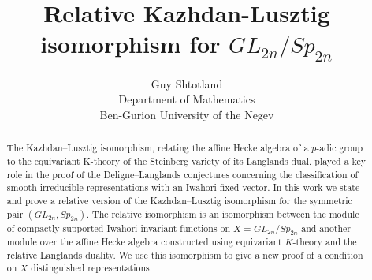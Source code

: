 \documentclass[12pt]{article}
\title{Relative Kazhdan-Lusztig isomorphism for $GL_{2n}/Sp_{2n}$}
\author{Guy Shtotland \\
\small Department of Mathematics\\
\small Ben-Gurion University of the Negev}
\date{}
\newcommand{\<}{\langle}
\renewcommand{\>}{\rangle}
\theoremstyle{plain}
\theoremstyle{definition}
\begin{document}
\maketitle
\setlength\parindent{0pt}

\begin{abstract}
The Kazhdan–Lusztig isomorphism, relating the affine Hecke algebra of a $p$-adic group to the equivariant K-theory of the Steinberg variety of its Langlands dual, played a key role in the proof of the Deligne–Langlands conjectures concerning the classification of smooth irreducible representations with an Iwahori fixed vector. In this work we state and prove a relative version of the Kazhdan–Lusztig isomorphism for the symmetric pair $(GL_{2n},Sp_{2n})$. The relative isomorphism is an isomorphism between the module of compactly supported Iwahori invariant functions on $X=GL_{2n}/Sp_{2n}$ and another module over the affine Hecke algebra constructed using equivariant $K$-theory and the relative Langlands duality. We use this isomorphism to give a new proof of a condition on $X$ distinguished representations.  

\end{abstract}
\end{document}
